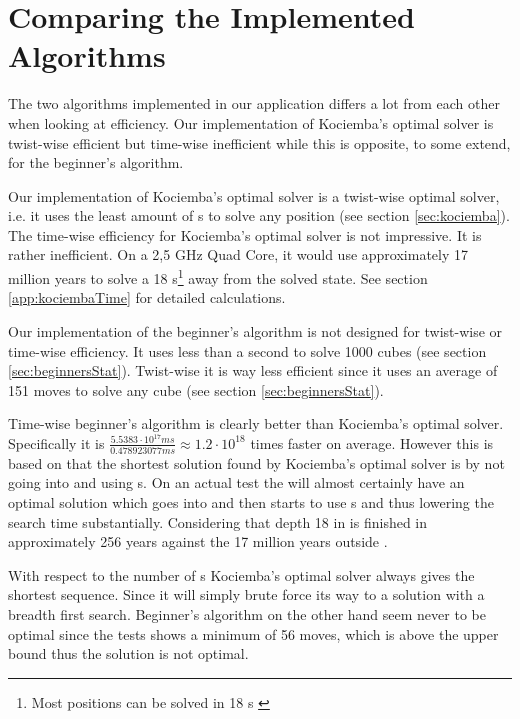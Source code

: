 \section{Comparing the Implemented Algorithms}
The two algorithms implemented in our application differs a lot from each other when looking at efficiency. 
Our implementation of Kociemba's optimal solver is twist-wise efficient but time-wise inefficient while this is opposite, to some extend, for the beginner's algorithm. 

Our implementation of Kociemba's optimal solver is a twist-wise optimal solver, i.e. it uses the least amount of \twist{}s to solve any position (see section \ref{sec:kociemba}).
The time-wise efficiency for Kociemba's optimal solver is not impressive.
It is rather inefficient.
On a 2,5 GHz Quad Core, it would use approximately 17 million years to solve a \cube{} 18 \twist{}s\footnote{Most positions can be solved in 18 \twist{}s \cite{kociemba09}} away from the solved state.
See section \ref{app:kociembaTime} for detailed calculations.   

Our implementation of the beginner's algorithm is not designed for twist-wise or time-wise efficiency. It uses less than a second to solve 1000 cubes (see section \ref{sec:beginnersStat}). 
Twist-wise it is way less efficient since it uses an average of 151 moves to solve any cube (see section \ref{sec:beginnersStat}).

Time-wise beginner's algorithm is clearly better than Kociemba's optimal solver.
Specifically it is $\frac{5.5383 \cdot 10^{17} ms}{0.478923077 ms} \approx 1.2 \cdot 10^{18}$ times faster on average.
However this is based on that the shortest solution found by Kociemba's optimal solver is by not going into  and using  \twist{}s.
On an actual test the \rubik{} will almost certainly have an optimal solution which goes into  and then starts to use  \twist{}s and thus lowering the search time substantially.
Considering that depth 18 in  is finished in approximately 256 years against the 17 million years outside .

With respect to the number of \twist{}s Kociemba's optimal solver always gives the shortest \twist{} sequence.
Since it will simply brute force its way to a solution with a breadth first search.%
Beginner's algorithm on the other hand seem never to be optimal since the tests shows a minimum of 56 moves, which is above the upper bound thus the solution is not optimal.

